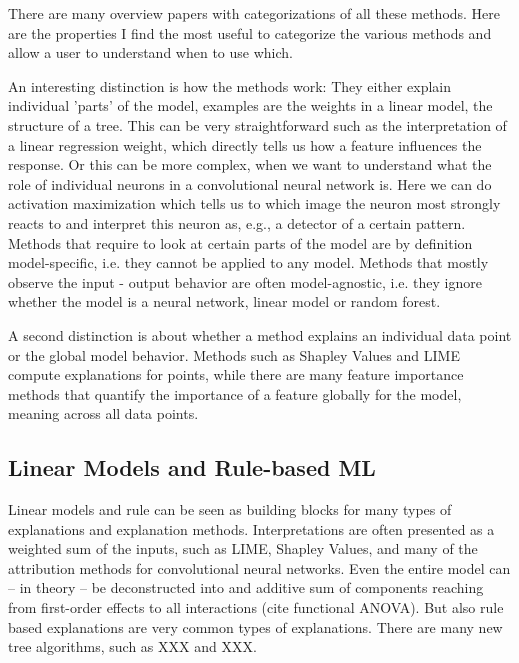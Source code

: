 \documentclass[runningheads]{llncs}
\begin{document}
There are many overview papers with categorizations of all these methods.
Here are the properties I find the most useful to categorize the various methods and allow a user to understand when to use which.

An interesting distinction is how the methods work:
They either explain individual 'parts' of the model, examples are the weights in a linear model, the structure of a tree.
This can be very straightforward such as the interpretation of a linear regression weight, which directly tells us how a feature influences the response.
Or this can be more complex, when we want to understand what the role of individual neurons in a convolutional neural network is.
Here we can do activation maximization which tells us to which image the neuron most strongly reacts to and interpret this neuron as, e.g., a detector of a certain pattern.
Methods that require to look at certain parts of the model are by definition model-specific, i.e. they cannot be applied to any model.
Methods that mostly observe the input - output behavior are often model-agnostic, i.e. they ignore whether the model is a neural network, linear model or random forest.

A second distinction is about whether a method explains an individual data point or the global model behavior.
Methods such as Shapley Values and LIME compute explanations for points, while there are many feature importance methods that quantify the importance of a feature globally for the model, meaning across all data points.

\subsection{Linear Models and Rule-based ML}

Linear models and rule can be seen as building blocks for many types of explanations and explanation methods.
Interpretations are often presented as a weighted sum of the inputs, such as LIME, Shapley Values, and many of the attribution methods for convolutional neural networks.
Even the entire model can -- in theory -- be deconstructed into and additive sum of components reaching from first-order effects to all interactions (cite functional ANOVA).
But also rule based explanations are very common types of explanations.
There are many new tree algorithms, such as XXX and XXX.
\end{document}
